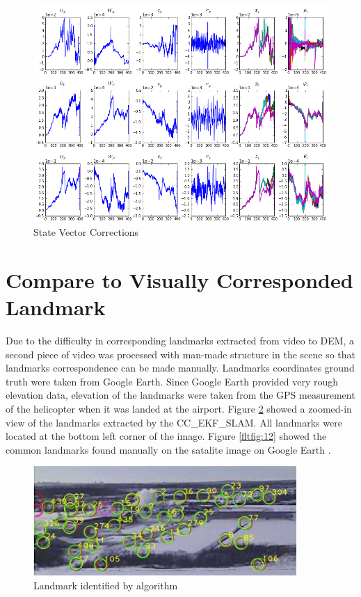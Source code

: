 \begin{figure}[h]
\centering
\includegraphics[width=12cm, keepaspectratio=true]
{./Figures/fltfig/cut1/Figure112.png}
\caption{State Vector Corrections}
\label{fltfig:4}
\end{figure}

\FloatBarrier

\section{Compare to Visually Corresponded Landmark}
\label{sec:flight-manual}
Due to the difficulty in corresponding landmarks extracted from video
to DEM, a second piece of video was processed with man-made structure
in the scene so that landmarks correspondence can be made manually.
Landmarks coordinates ground truth were taken from Google Earth. Since
Google Earth provided very rough elevation data, elevation of the
landmarks were taken from the GPS measurement of the helicopter when
it was landed at the airport. Figure \ref{fltfig:11} showed a
zoomed-in view of the landmarks extracted by the CC\_EKF\_SLAM. All
landmarks were located at the bottom left corner of the image. Figure
\ref{fltfig:12} showed the common landmarks found manually on the
satalite image on Google Earth \cite{_google_????}.

\begin{figure}[h]
\centering
\includegraphics[width=10cm, keepaspectratio=true]
{./Figures/fltfig/airport/frame398_landmarks.jpg}
\caption{Landmark identified by algorithm }
\label{fltfig:11}
\end{figure}

